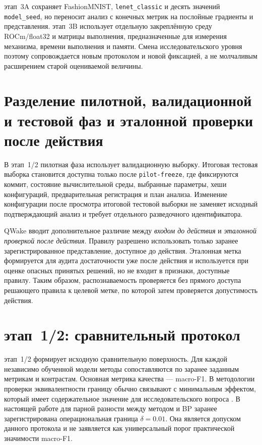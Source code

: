 этап~3A сохраняет FashionMNIST, \texttt{lenet\_classic} и десять значений
\texttt{model\_seed}, но переносит анализ с конечных метрик на послойные
градиенты и представления. этап~3B использует отдельную закреплённую среду
ROCm/float32 и матрицы выполнения, предназначенные для измерения механизма,
времени выполнения и памяти. Смена исследовательского уровня поэтому
сопровождается новым протоколом и новой фиксацией, а не молчаливым расширением
старой оцениваемой величины.

\section{Разделение пилотной, валидационной и тестовой фаз и эталонной проверки после действия}
\label{sec:method-data-separation}

В этап~1/2 пилотная фаза использует валидационную выборку. Итоговая тестовая
выборка становится доступна только после \texttt{pilot-freeze}, где фиксируются
коммит, состояние вычислительной среды, выбранные параметры, хеши конфигураций,
предварительная регистрация и план анализа. Изменение конфигурации после
просмотра итоговой тестовой выборки не заменяет исходный подтверждающий анализ и
требует отдельного разведочного идентификатора.

QWake вводит дополнительное различие между \emph{входом до действия} и
\emph{эталонной проверкой после действия}. Правилу разрешено использовать только заранее
зарегистрированное представление, доступное до действия. Эталонная метка
формируется для аудита достаточности уже после действия и используется при
оценке опасных принятых решений, но не входит в признаки, доступные правилу.
Таким образом, распознаваемость проверяется без прямого доступа решающего
правила к целевой метке, по которой затем проверяется допустимость действия.

\section{этап~1/2: сравнительный протокол}
\label{sec:method-stage12}

этап~1/2 формирует исходную сравнительную поверхность. Для каждой независимо
обученной модели методы сопоставляются по заранее заданным метрикам и
контрастам. Основная метрика качества --- macro-F1. В методологии проверки
эквивалентности границу обычно связывают с минимальным эффектом, который имеет
содержательное значение для исследовательского вопроса
\cite{lakens2017equivalence}. В настоящей работе для парной разности между
методом и BP заранее зарегистрирована операциональная граница
\(\delta=0.01\). Она является допуском данного протокола и не заявляется как
универсальный порог практической значимости macro-F1.

